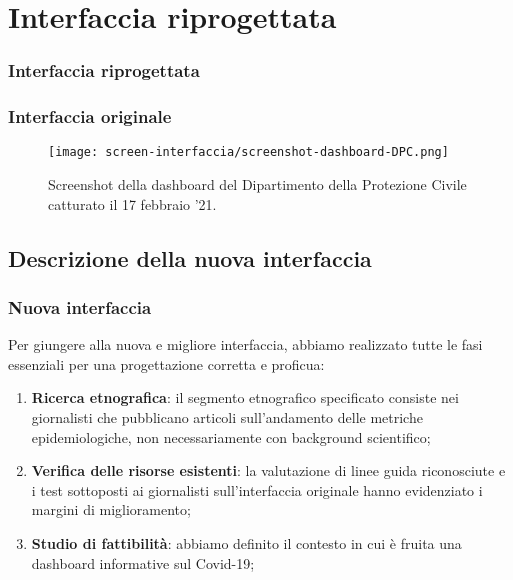 \documentclass[../../main.tex]{subfiles}
\begin{document}
    
\section{Interfaccia riprogettata}

\begin{frame}
    \frametitle{Interfaccia riprogettata}
\end{frame}


\begin{frame}
    \frametitle{Interfaccia originale}
    \begin{figure}
        \centering
        \texttt{[image: screen-interfaccia/screenshot-dashboard-DPC.png]}
        \caption{Screenshot della dashboard del Dipartimento della Protezione Civile catturato il 17 febbraio '21.}
    \end{figure}
    
\end{frame}


\subsection{Descrizione della nuova interfaccia}

\begin{frame}
    \frametitle{Nuova interfaccia}
    Per giungere alla nuova e migliore interfaccia, abbiamo realizzato tutte le fasi essenziali per una progettazione corretta e proficua: 
    \begin{enumerate}
        \item<1-> \textbf{Ricerca etnografica}: il segmento etnografico specificato consiste nei giornalisti che pubblicano articoli sull'andamento delle metriche epidemiologiche, non necessariamente con background scientifico;
        \item<2-> \textbf{Verifica delle risorse esistenti}: la valutazione di linee guida riconosciute e i test sottoposti ai giornalisti sull'interfaccia originale hanno evidenziato i margini di miglioramento;
        \item<3->  \textbf{Studio di fattibilità}: abbiamo definito il contesto in cui è fruita una dashboard informative sul Covid-19;
    \end{enumerate}  

\end{frame}
\end{document}
